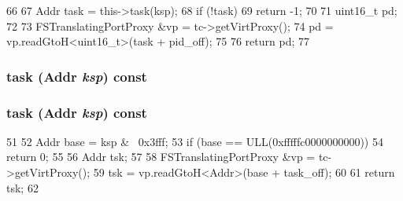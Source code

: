 \begin{DoxyCode}
66 {
67     Addr task = this->task(ksp);
68     if (!task)
69         return -1;
70 
71     uint16_t pd;
72 
73     FSTranslatingPortProxy &vp = tc->getVirtProxy();
74     pd = vp.readGtoH<uint16_t>(task + pid_off);
75 
76     return pd;
77 }
\end{DoxyCode}
\hypertarget{classMipsISA_1_1ProcessInfo_a05de971c556b8e4418a60289f92dfba3}{
\subsubsection[{task}]{ task ({\bf Addr} {\em ksp}) const}}
\label{classMipsISA_1_1ProcessInfo_a05de971c556b8e4418a60289f92dfba3}
\hypertarget{classMipsISA_1_1ProcessInfo_a05de971c556b8e4418a60289f92dfba3}{
\subsubsection[{task}]{ task ({\bf Addr} {\em ksp}) const}}
\label{classMipsISA_1_1ProcessInfo_a05de971c556b8e4418a60289f92dfba3}



\begin{DoxyCode}
51 {
52     Addr base = ksp & ~0x3fff;
53     if (base == ULL(0xfffffc0000000000))
54         return 0;
55 
56     Addr tsk;
57 
58     FSTranslatingPortProxy &vp = tc->getVirtProxy();
59     tsk = vp.readGtoH<Addr>(base + task_off);
60 
61     return tsk;
62 }
\end{DoxyCode}


